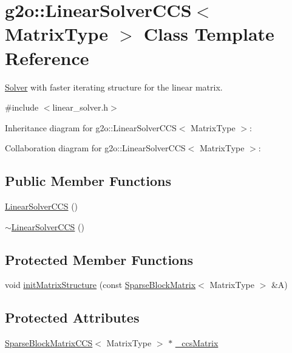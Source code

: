 \hypertarget{classg2o_1_1LinearSolverCCS}{}\section{g2o\+:\+:Linear\+Solver\+C\+CS$<$ Matrix\+Type $>$ Class Template Reference}
\label{classg2o_1_1LinearSolverCCS}


\hyperlink{classg2o_1_1Solver}{Solver} with faster iterating structure for the linear matrix.  




{\ttfamily \#include $<$linear\+\_\+solver.\+h$>$}



Inheritance diagram for g2o\+:\+:Linear\+Solver\+C\+CS$<$ Matrix\+Type $>$\+:


Collaboration diagram for g2o\+:\+:Linear\+Solver\+C\+CS$<$ Matrix\+Type $>$\+:
\subsection*{Public Member Functions}
\begin{DoxyCompactItemize}
\item 
\hyperlink{classg2o_1_1LinearSolverCCS_aa4a8b0612a60769481c40d2d1a6b03ce}{Linear\+Solver\+C\+CS} ()
\item 
\hyperlink{classg2o_1_1LinearSolverCCS_aa131fa8ea836eafdc1313fdf3a4217f9}{$\sim$\+Linear\+Solver\+C\+CS} ()
\end{DoxyCompactItemize}
\subsection*{Protected Member Functions}
\begin{DoxyCompactItemize}
\item 
void \hyperlink{classg2o_1_1LinearSolverCCS_a070138d7e2a68a576e015f5073a4a464}{init\+Matrix\+Structure} (const \hyperlink{classg2o_1_1SparseBlockMatrix}{Sparse\+Block\+Matrix}$<$ Matrix\+Type $>$ \&A)
\end{DoxyCompactItemize}
\subsection*{Protected Attributes}
\begin{DoxyCompactItemize}
\item 
\hyperlink{classg2o_1_1SparseBlockMatrixCCS}{Sparse\+Block\+Matrix\+C\+CS}$<$ Matrix\+Type $>$ $\ast$ \hyperlink{classg2o_1_1LinearSolverCCS_a07f0df9a6012d567e26a89063c53aa12}{\+\_\+ccs\+Matrix}
\end{DoxyCompactItemize}


